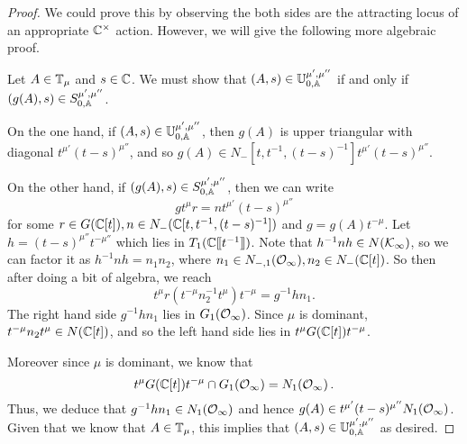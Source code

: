 \documentclass[draft]{article}
\begin{document}
\begin{proof}
We could prove this by observing the both sides are the attracting locus of an appropriate $ \CC^\times$ action. However, we will give the following more algebraic proof.


 Let $ A \in \TT_\mu$ and $ s \in \CC $. We must show that  $ (A,s) \in \UU^{\mu', \mu''}_{0,\AA} $ if and only if $ (g(A),s) \in S^{\mu', \mu''}_{0,\AA} $.
 
 On the one hand, if $ (A,s) \in \UU^{\mu', \mu''}_{0,\AA} $, then $ g(A)$ is upper triangular with diagonal $ t^{\mu'} (t-s)^{\mu''}$, and so $ g(A) \in N_-[t, t^{-1}, (t-s)^{-1}] t^{\mu'} (t-s)^{\mu''}$.
 
 On the other hand, if $ (g(A), s) \in S^{\mu', \mu''}_{0,\AA}$, then we can write 
 $$
 g t^\mu r= n t^{\mu'} (t-s)^{\mu''}
$$
for some $ r \in G(\CC[t]), n \in N_-(\CC[t, t^{-1}, (t-s)^{-1}]) $ and $ g = g(A)t^{-\mu}$.  Let $ h = (t-s)^{\mu''} t^{-\mu''}$ which lies in $ T_1(\CC\xt[t^{-1}]) $.
Note that $ h^{-1}n h \in N(\Kinf)$, 
so we can factor it as $ h^{-1} n h  = n_1 n_2 $, where $ n_1 \in N_{-,1}(\Oinf), n_2 \in N_-(\CC[t])$.  So then after doing a bit of algebra, we reach
$$
t^\mu r (t^{-\mu} n_2^{-1} t^\mu) t^{-\mu} = g^{-1} h n_1.
$$
The right hand side $ g^{-1} h n_1 $ lies in $ G_1(\Oinf) $.  Since $ \mu $ is dominant, $ t^{-\mu} n_2 t^\mu \in N(\CC[t])$, and so the left hand side lies in $t^\mu G(\CC[t]) t^{-\mu}$.

Moreover since $ \mu $ is dominant, we know that 
$$t^\mu G(\CC[t]) t^{-\mu} \cap G_1(\Oinf) = N_1(\Oinf)\,.$$
Thus, we deduce that $ g^{-1} h n_1 \in N_1(\Oinf)$ 
and hence $ g(A) \in t^{\mu'} (t-s)^{\mu''} N_1(\Oinf) $.  Given that we know that $ A \in \TT_\mu $, this implies that $ (A,s) \in \UU^{\mu', \mu''}_{0,\AA}$ as desired.
\end{proof}

\end{document}
